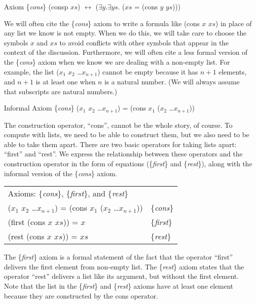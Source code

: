 \label{cons-axiom-formal}
Axiom \{\emph{cons}\} (consp $xs$) $\leftrightarrow$ ($\exists y. \exists ys.$ ($xs$ = (cons $y$ $ys$)))

We will often cite the \{\emph{cons}\} axiom to write a formula like (cons $x$ $xs$) in place of any list we know is not empty. When we do this, we will take care to choose the symbols $x$ and $xs$ to avoid conflicts with other symbols that appear in the context of the discussion.
Furthermore, we will often cite a less formal version of the \{\emph{cons}\} axiom when we know we are dealing with a non-empty list. For example, the list ($x_1$ $x_2$ \dots $x_{n+1}$) cannot be empty because it has $n+1$ elements, and $n+1$ is at least one when $n$ is a natural number. (We will always assume that subscripts are natural numbers.)

\label{cons-axiom-informal}
Informal Axiom \{\emph{cons}\}
($x_1$ $x_2$ \dots $x_{n+1}$) = (cons $x_1$ ($x_2$ \dots $x_{n+1}$))

The construction operator, ``cons'', cannot be the whole story, of course. To compute with lists, we  need to be able to construct them, but we also need to be able to take them apart. There are two basic operators for taking lists apart: ``first'' and ``rest''. We express the relationship between these operators and the construction operator in the form of equations (\{\emph{first}\} and \{\emph{rest}\}), along with the informal version of the \{\emph{cons}\} axiom.

\label{first-rest-cons}
\begin{tabular}{ll}
 Axioms: \{\emph{cons}\}, \{\emph{first}\}, and \{\emph{rest}\}       &                 \\
 ($x_1$ $x_2$ \dots $x_{n+1}$) = (cons $x_1$ ($x_2$ \dots $x_{n+1}$)) & \{\emph{cons}\} \\
 (first (cons $x$ $xs$)) = $x$                                        & \{\emph{first}\}\\
 (rest (cons $x$ $xs$))  = $xs$                                       & \{\emph{rest}\} \\
\end{tabular}

The \{\emph{first}\} axiom is a formal statement of the fact that the operator ``first'' delivers the first element from non-empty list. The \{\emph{rest}\} axiom states that the operator ``rest'' delivers a list like its argument, but without the first element. Note that the list in the \{\emph{first}\} and \{\emph{rest}\} axioms have at least one element because they are constructed by the cons operator.

